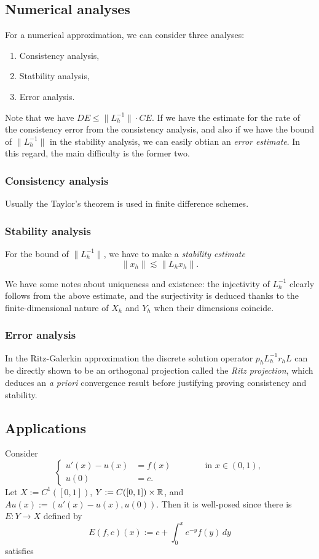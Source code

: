 \documentclass{../../large}
\begin{document}
\subsection{Numerical analyses}
For a numerical approximation, we can consider three analyses:
\begin{enumerate}
	\item Consistency analysis,
	\item Statbility analysis,
	\item Error analysis.
\end{enumerate}
Note that we have $DE\le\|L_h^{-1}\|\cdot CE$.
If we have the estimate for the rate of the consistency error from the consistency analysis, and also if we have the bound of $\|L_h^{-1}\|$ in the stability analysis, we can easily obtian an \emph{error estimate}.
In this regard, the main difficulty is the former two.


\subsubsection*{Consistency analysis}
Usually the Taylor's theorem is used in finite difference schemes.


\subsubsection*{Stability analysis}
For the bound of $\|L_h^{-1}\|$, we have to make a \emph{stability estimate}
\[\|x_h\|\lesssim\|L_hx_h\|.\]

We have some notes about uniqueness and existence: the injectivity of $L_h^{-1}$ clearly follows from the above estimate, and the surjectivity is deduced thanks to the finite-dimensional nature of $X_h$ and $Y_h$ when their dimensions coincide.

\subsubsection*{Error analysis}
In the Ritz-Galerkin approximation the discrete solution operator $p_hL_h^{-1}r_hL$ can be directly shown to be an orthogonal projection called the \emph{Ritz projection}, which deduces an \emph{a priori} convergence result before justifying proving consistency and stability.




\subsection{Applications}
\begin{ex}
Consider
\[\left\{\begin{alignedat}{2}
u'(x)-u(x)&=f(x) &\qquad&\text{ in }x\in(0,1),\\
u(0)&=c. &&
\end{alignedat}\right.\]
Let $X:=C^1([0,1])$, $Y:=C([0,1])\times\mathbb{R}$, and $Au(x):=(u'(x)-u(x),u(0))$.
Then it is well-posed since there is $E:Y\to X$ defined by
\[E(f,c)(x):=c+\int_0^xe^{-y}f(y)\,dy\]
satisfies
\end{ex}
\end{document}
